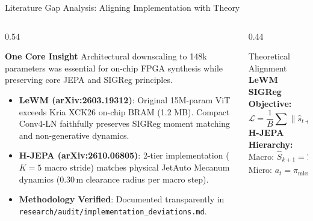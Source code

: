 \documentclass[aspectratio=169, 10pt]{beamer}
\begin{document}
\begin{frame}{Literature Gap Analysis: Aligning Implementation with Theory}
  \begin{columns}
    \begin{column}{0.54\textwidth}
      \begin{block}{\textbf{One Core Insight}}
        Architectural downscaling to 148k parameters was essential for on-chip FPGA synthesis while preserving core JEPA and SIGReg principles.
      \end{block}
      \vspace{0.3em}
      \begin{itemize}
        \footnotesize
        \item \textbf{LeWM (arXiv:2603.19312)}: Original 15M-param ViT exceeds Kria XCK26 on-chip BRAM (1.2 MB). Compact Conv4-LN faithfully preserves SIGReg moment matching and non-generative dynamics.
        \item \textbf{H-JEPA (arXiv:2610.06805)}: 2-tier implementation ($K=5$ macro stride) matches physical JetAuto Mecanum dynamics ($0.30\,\text{m}$ clearance radius per macro step).
        \item \textbf{Methodology Verified}: Documented transparently in \texttt{research/audit/implementation\_deviations.md}.
      \end{itemize}
    \end{column}
    \begin{column}{0.44\textwidth}
      \centering
      \begin{block}{Theoretical Alignment}
        \tiny
        \textbf{LeWM SIGReg Objective:}
        $$\mathcal{L} = \frac{1}{B}\sum \|\hat{s}_{t+1} - \text{sg}(s_{t+1})\|^2 + \lambda_{\text{reg}}\mathcal{L}_{\text{SIGReg}}(s)$$
        \textbf{H-JEPA Hierarchy:}
        $$\text{Macro: } \hat{S}_{k+1} = T_{\text{macro}}(S_k, A^{\text{macro}}_k)$$
        $$\text{Micro: } a_t = \pi_{\text{micro}}(s_t, \hat{S}_{k+1})$$
      \end{block}
    \end{column}
  \end{columns}
\end{frame}
\end{document}
